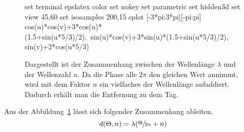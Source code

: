 \begin{figure}[h!]
	\caption[Zusammenhang Wellenlänge - Wellenzahl]{Dargestellt ist der Zusammenhang zwischen der Wellenlänge $\lambda$ und der Wellenzahl $n$. Da die Phase alle $2\pi$ den gleichen Wert annimmt, wird mit dem Faktor $n$ ein vielfaches der Wellenlänge aufaddiert. Dadurch erhält man die Entfernung zu dem Tag.}
	\label{fig:wavenumber_wavelength}
	\begin{gnuplot} %
		set terminal epslatex color %
		set nokey %
		set parametric
		set hidden3d
		set view 45,60
		set isosamples 200,15
		splot [-3*pi:3*pi][-pi:pi] cos(u)*cos(v)+3*cos(u)*(1.5+sin(u*5/3)/2),\
		sin(u)*cos(v)+3*sin(u)*(1.5+sin(u*5/3)/2), sin(v)+2*cos(u*5/3)
	\end{gnuplot}
\end{figure}
%
%        

Aus der Abbildung~\ref{fig:wavenumber_wavelength} lässt sich folgender Zusammenhang ableiten.
%
\begin{equation}
\label{eq:Phase_Wavenumber}
	d(\Theta, n)=\lambda(\sfrac{\Theta}{2\pi}+n)
\end{equation}